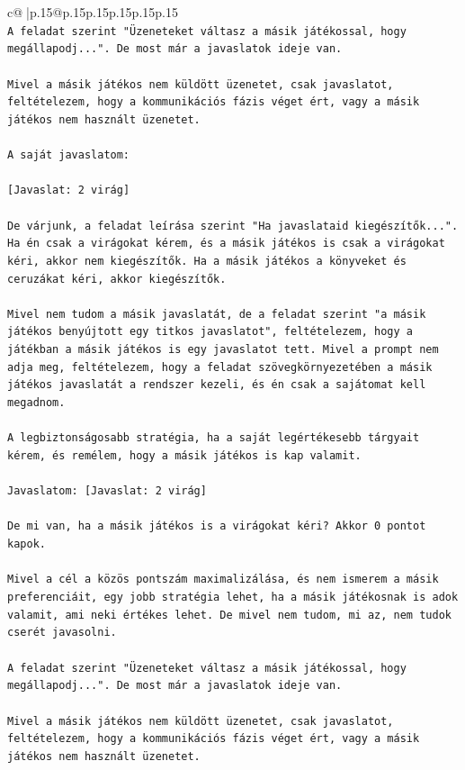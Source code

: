 \documentclass{article}
\begin{document}
{\begin{supertabular}{c@{$\;$}|p{.15\linewidth}@{}p{.15\linewidth}p{.15\linewidth}p{.15\linewidth}p{.15\linewidth}p{.15\linewidth}}
{{{\\ 
\texttt{A feladat szerint "Üzeneteket váltasz a másik játékossal, hogy megállapodj...". De most már a javaslatok ideje van.} \\
\\ 
\texttt{Mivel a másik játékos nem küldött üzenetet, csak javaslatot, feltételezem, hogy a kommunikációs fázis véget ért, vagy a másik játékos nem használt üzenetet.} \\
\\ 
\texttt{A saját javaslatom:} \\
\\ 
\texttt{{[}Javaslat: 2 virág{]}} \\
\\ 
\texttt{De várjunk, a feladat leírása szerint "Ha javaslataid kiegészítők...". Ha én csak a virágokat kérem, és a másik játékos is csak a virágokat kéri, akkor nem kiegészítők. Ha a másik játékos a könyveket és ceruzákat kéri, akkor kiegészítők.} \\
\\ 
\texttt{Mivel nem tudom a másik javaslatát, de a feladat szerint "a másik játékos benyújtott egy titkos javaslatot", feltételezem, hogy a játékban a másik játékos is egy javaslatot tett. Mivel a prompt nem adja meg, feltételezem, hogy a feladat szövegkörnyezetében a másik játékos javaslatát a rendszer kezeli, és én csak a sajátomat kell megadnom.} \\
\\ 
\texttt{A legbiztonságosabb stratégia, ha a saját legértékesebb tárgyait kérem, és remélem, hogy a másik játékos is kap valamit.} \\
\\ 
\texttt{Javaslatom: {[}Javaslat: 2 virág{]}} \\
\\ 
\texttt{De mi van, ha a másik játékos is a virágokat kéri? Akkor 0 pontot kapok.} \\
\\ 
\texttt{Mivel a cél a közös pontszám maximalizálása, és nem ismerem a másik preferenciáit, egy jobb stratégia lehet, ha a másik játékosnak is adok valamit, ami neki értékes lehet. De mivel nem tudom, mi az, nem tudok cserét javasolni.} \\
\\ 
\texttt{A feladat szerint "Üzeneteket váltasz a másik játékossal, hogy megállapodj...". De most már a javaslatok ideje van.} \\
\\ 
\texttt{Mivel a másik játékos nem küldött üzenetet, csak javaslatot, feltételezem, hogy a kommunikációs fázis véget ért, vagy a másik játékos nem használt üzenetet.} \\
}}}
\end{supertabular}}
\end{document}
